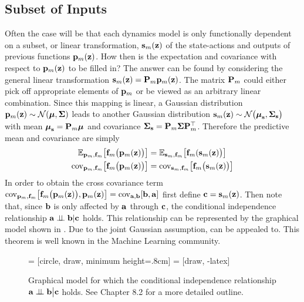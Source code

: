 \subsection{Subset of Inputs}
Often the case will be that each dynamics model is only functionally dependent on a subset, or linear transformation, $\mathbf{s}_m(\mathbf{z})$ of the state-actions and outputs of previous functions $\mathbf{p}_m(\mathbf{z})$. How then is the expectation and covariance with respect to $\mathbf{p}_m(\mathbf{z})$ to be filled in? The answer can be found by considering the general linear transformation $\mathbf{s}_m(\mathbf{z}) = \mathbf{P}_m\mathbf{p}_m(\mathbf{z})$. The matrix $\mathbf{P}_m$ could either pick off appropriate elements of $\mathbf{p}_m$ or be viewed as an arbitrary linear combination. Since this mapping is linear, a Gaussian distribution $\mathbf{p}_m(\mathbf{z}) \sim \mathcal{N}(\boldsymbol{\mu},\boldsymbol{\Sigma})$ leads to another Gaussian distribution $\mathbf{s}_m(\mathbf{z}) \sim \mathcal{N}\big(\boldsymbol{\mu}_{\mathbf{s}},\boldsymbol{\Sigma}_{\mathbf{s}}\big)$ with mean $\boldsymbol{\mu}_{\mathbf{s}} = \mathbf{P}_m\boldsymbol{\mu}$ and covariance $\boldsymbol{\Sigma}_{\mathbf{s}} = \mathbf{P}_m\boldsymbol{\Sigma}\mathbf{P}_m^\top$. Therefore the predictive mean and covariance are simply
\begin{align*}
\mathbb{E}_{\mathbf{p}_m,\mathbf{f}_m}\big[\mathbf{f}_m\big(\mathbf{p}_m(\mathbf{z})\big)\big] &= \mathbb{E}_{\mathbf{s}_m,\mathbf{f}_m}\big[\mathbf{f}_m(\mathbf{s}_m(\mathbf{z})\big)\big] \\
\mathrm{cov}_{\mathbf{p}_m,\mathbf{f}_m}\big[\mathbf{f}_m\big(\mathbf{p}_m(\mathbf{z})\big)\big] &= \mathrm{cov}_{\mathbf{s}_m,\mathbf{f}_m}\big[\mathbf{f}_m\big(\mathbf{s}_m(\mathbf{z})\big)\big]
\end{align*}
In order to obtain the cross covariance term $\mathrm{cov}_{\mathbf{p}_m,\mathbf{f}_m}\big[\mathbf{f}_m\big(\mathbf{p}_m(\mathbf{z})\big), \mathbf{p}_m(\mathbf{z})\big] = \mathrm{cov}_{\mathbf{a},\mathbf{b}}[\mathbf{b},\mathbf{a}]$ first define $\mathbf{c} = \mathbf{s}_m(\mathbf{z})$. Then note that, since $\mathbf{b}$ is only affected by $\mathbf{a}$ through $\mathbf{c}$, the conditional independence relationship $\mathbf{a} \perp\!\!\!\perp \mathbf{b} | \mathbf{c}$ holds. This relationship can be represented by the graphical model shown in . Due to the joint Gaussian assumption,  can be appealed to. This theorem is well known in the Machine Learning community.






\begin{figure}[t]
\centering
%
 = [circle, draw, minimum height=.8cm]
 = [draw, -latex]
%
\caption{Graphical model for which the conditional independence relationship $\mathbf{a} \perp\!\!\!\perp \mathbf{b} \big| \mathbf{c}$ holds. See \cite{Bish06} Chapter 8.2 for a more detailed outline.}
\label{fig:condind}
\end{figure}





